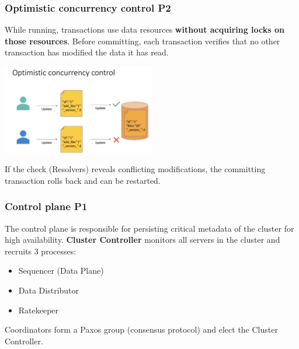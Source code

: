 \begin{frame}
	\frametitle{Optimistic concurrency control P2}
While running, transactions use data resources \textbf{without acquiring locks on those resources}. Before committing, each transaction verifies that no other transaction has modified the data it has read. 
\vspace{0.2cm}

\begin{center}
    \includegraphics[width=0.5\textwidth]{img/2-Architecture/Optimistic Concurrency Control.png}
\end{center}

If the check (Resolvers) reveals conflicting modifications, the committing transaction rolls back and can be restarted.


\end{frame}

\begin{frame}
	\frametitle{Control plane P1}

The control plane is responsible for persisting critical metadata of the cluster for high availability.
\textbf{Cluster Controller} monitors all servers in the cluster and recruits 3 processes:
\begin{itemize}
    \item Sequencer (Data Plane)
    \item Data Distributor
    \item Ratekeeper
\end{itemize}

Coordinators form a Paxos group (consensus protocol) and elect the Cluster Controller.
\end{frame}




